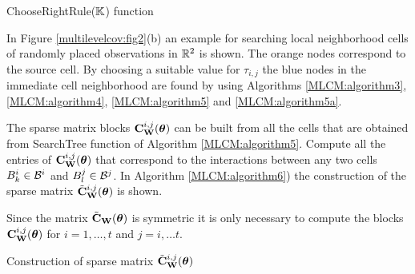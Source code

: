 \documentclass[11pt,final]{amsart}       %
\begin{document}
\begin{algorithm}[htp]

\caption{ChooseRightRule($\mathbb{K}$) function}
\label{MLCM:algorithm5a}
\end{algorithm}

In Figure \ref{multilevelcov:fig2}(b) an example for searching local
neighborhood cells of randomly placed observations in $\Bbb{R}^{2}$ is
shown. The orange nodes correspond to the source cell. By choosing a
suitable value for $\tau_{i,j}$ the blue nodes in the immediate cell
neighborhood are found by using Algorithms \ref{MLCM:algorithm3},
\ref{MLCM:algorithm4}, \ref{MLCM:algorithm5} and
\ref{MLCM:algorithm5a}.

The sparse matrix blocks $\mathbf{C}^{i,j}_{\mathbf{W}}(\boldsymbol{\theta})$ can be built from
all the cells that are obtained from SearchTree function of Algorithm
\ref{MLCM:algorithm5}. Compute all the entries of
$\mathbf{C}^{i,j}_{\mathbf{W}}(\boldsymbol{\theta})$ that correspond to the interactions between
any two cells $B^{i}_k \in {\mathcal B}^{i}$ and $B^{j}_l \in {\mathcal B}^{j}$. In
Algorithm \ref{MLCM:algorithm6}) the construction of the sparse matrix
$\tilde {\mathbf{C}}^{i,j}_{\mathbf{W}}(\boldsymbol{\theta})$ is shown.

\begin{remark}
Since the matrix $\tilde {\mathbf{C}}_{\mathbf{W}}(\boldsymbol{\theta})$ is symmetric it is only
necessary to compute the blocks $\mathbf{C}^{i,j}_{\mathbf{W}}(\boldsymbol{\theta})$ for $i = 1,
\dots, t$ and $j = i, \dots t$.
\end{remark}

\begin{algorithm}
   
\caption{Construction of sparse matrix $\tilde {\mathbf{C}}^{i,j}_{\mathbf{W}}(\boldsymbol{\theta})$}
\label{MLCM:algorithm6}
\end{algorithm}
\end{document}
